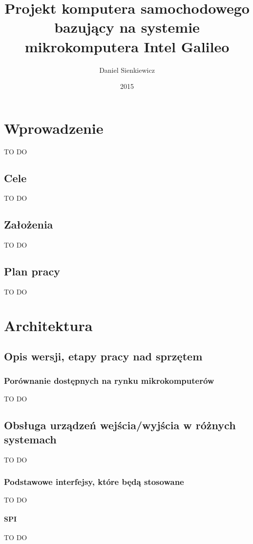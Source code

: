 \documentclass{xmgr}
\author   {Daniel Sienkiewicz}
\title    {Projekt komputera samochodowego bazujący na systemie mikrokomputera Intel Galileo}
\date     {2015}
\begin{document}
\begin{abstract}

\end{abstract}
\maketitle

\chapter{Wprowadzenie}
TO DO
\section{Cele}
TO DO
\section{Założenia}
TO DO
\section{Plan pracy}
TO DO

\chapter{Architektura}
\section{Opis wersji, etapy pracy nad sprzętem}
\subsection{Porównanie dostępnych na rynku mikrokomputerów}
TO DO
\section{Obsługa urządzeń wejścia/wyjścia w różnych systemach}
TO DO
\subsection{Podstawowe interfejsy, które będą stosowane}
TO DO
\subsubsection{SPI}
TO DO
\end{document}
